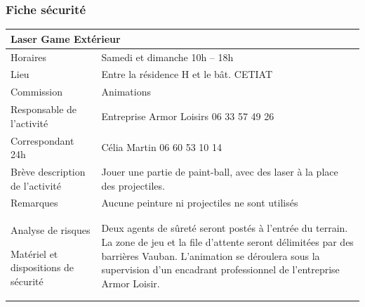 \documentclass[hidelinks, paper=a4, fontsize=13pt]{report}
\begin{document}
\subsubsection{Fiche sécurité}
\begin{center}
\begin{tabular}{ | p{6cm} | p{10cm} | }
\hline
	\multicolumn{2}{|l|}{Laser Game Extérieur}  \\ \hline
	Horaires & Samedi et dimanche 10h – 18h \\ \hline
	Lieu & Entre la résidence H et le bât. CETIAT \\ \hline
	Commission & Animations \\ \hline
	Responsable de l'activité & Entreprise Armor Loisirs 06 33 57 49 26 \\ \hline
	Correspondant 24h & Célia Martin 06 60 53 10 14 \\ \hline
	Brève description de l'activité & Jouer une partie de paint-ball, avec des laser à la place des projectiles. \\ \hline
	Remarques & Aucune peinture ni projectiles ne sont utilisés\\ \hline
	Analyse de risques
	
Matériel et dispositions de sécurité & Deux agents de sûreté seront postés à l’entrée du terrain. La zone de jeu et la file d'attente seront délimitées par des barrières Vauban. L'animation se déroulera sous la supervision d'un encadrant professionnel de l'entreprise Armor Loisir. \\ \hline
\end{tabular}

\end{center}
\end{document}
